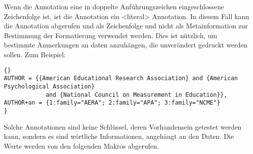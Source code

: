 \documentclass{ltxdockit}[2011/03/25]
\begin{document}
Wenn die Annotation eine in doppelte Anführungszeichen eingeschlossene Zeichenfolge ist, ist die 
Annotation ein <literal> Annotation. In diesem Fall kann die Annotation abgerufen und als 
Zeichenfolge und nicht als Metainformation zur Bestimmung der Formatierung verwendet werden.
Dies ist nützlich, um bestimmte Anmerkungen an daten anzuhängen, die unverändert gedruckt werden sollen.
Zum Beispiel:

\begin{lstlisting}[style=bibtex]{}
AUTHOR = {{American Educational Research Association} and {American Psychological Association}
            and {National Council on Measurement in Education}},
AUTHOR+an = {1:family="AERA"; 2:family="APA"; 3:family="NCME"}
}
\end{lstlisting}
%
Solche Annotationen sind keine Schlüssel, deren Vorhandensein getestet werden kann, sondern es
sind wörtliche Informationen, angehängt an den Daten. Die Werte werden von den folgenden
Makros abgerufen.
\end{document}
